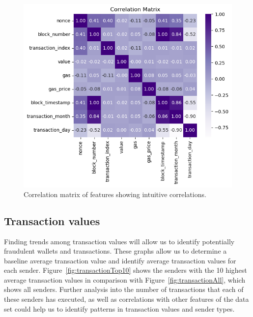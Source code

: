 \documentclass[sigconf]{acmart}
\begin{document}
\begin{figure}[H]
    \centering
    \includegraphics[width=0.8\linewidth]{M4-correlation-matrix.png}
    \caption{Correlation matrix of features showing intuitive correlations.}
    \label{fig:m4CorrelationMatrix}
\end{figure}

\subsection{Transaction values}
Finding trends among transaction values will allow us to identify potentially fraudulent wallets and transactions. These graphs allow us to determine a baseline average transaction value and identify average transaction values for each sender. Figure~\ref{fig:transactionTop10} shows the senders with the 10 highest average transaction values in comparison with Figure~\ref{fig:transactionAll}, which shows all senders. Further analysis into the number of transactions that each of these senders has executed, as well as correlations with other features of the data set could help us to identify patterns in transaction values and sender types.
\end{document}
